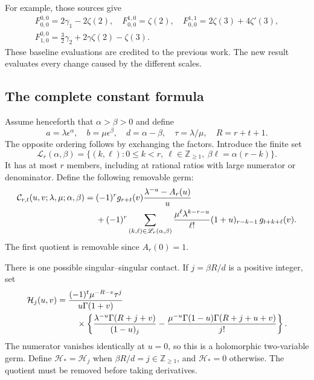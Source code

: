 For example, those sources give
\begin{equation}\label{mc:FP-values}
 \begin{gathered}
 F_{0,0}^{0,0}=2\gamma_1-2\zeta(2),\quad
 F_{0,0}^{1,0}=\zeta(2),\quad
 F_{0,0}^{1,1}=2\zeta(3)+4\zeta'(3),\\
 F_{1,0}^{0,0}=\tfrac32\gamma_2+2\gamma\zeta(2)-\zeta(3).
 \end{gathered}
\end{equation}
These baseline evaluations are credited to the previous work.
The new result evaluates every change caused by the different scales.

\subsection{The complete constant formula}

Assume henceforth that $\alpha>\beta>0$ and define
\begin{equation}\label{mc:scales}
 a=\lambda\epsilon^\alpha,\quad b=\mu\epsilon^\beta,
 \quad d=\alpha-\beta,\quad \tau=\lambda/\mu,
 \quad R=r+t+1.
\end{equation}
The opposite ordering follows by exchanging the factors.
Introduce the finite set
\begin{equation}\label{mc:resonance-set}
 \mathscr L_r(\alpha,\beta)
 =\{(k,\ell):0\le k<r,\ \ell\in\mathbb Z_{\ge1},\
                      \beta\ell=\alpha(r-k)\}.
\end{equation}
It has at most $r$ members, including at rational ratios with
large numerator or denominator. Define the following removable germ:
\begin{align}\label{mc:mixed-contact}
 \mathcal C_{r,t}(u,v;\lambda,\mu;\alpha,\beta)
 ={}&(-1)^r g_{r+t}(v)
                  \frac{\lambda^{-u}-A_r(u)}u\notag\\
 &+(-1)^r\sum_{(k,\ell)\in\mathscr L_r(\alpha,\beta)}
   \frac{\mu^\ell\lambda^{k-r-u}}{\ell!}
                 (1+u)_{r-k-1}\,g_{t+k+\ell}(v).
\end{align}
The first quotient is removable since $A_r(0)=1$.

There is one possible singular--singular contact. If
$j=\beta R/d$ is a positive integer, set
\begin{align}\label{mc:singular-contact}
 \mathcal H_j(u,v)={}&
 \frac{(-1)^t\mu^{-R-v}\tau^j}{u\Gamma(1+v)}\notag\\
 &\quad\times\left\{
 \frac{\lambda^{-u}\Gamma(R+j+v)}{(1-u)_j}
 -\frac{\mu^{-u}\Gamma(1-u)\Gamma(R+j+u+v)}{j!}
                 \right\}.
\end{align}
The numerator vanishes identically at $u=0$, so this is a
holomorphic two-variable germ. Define $\mathcal H_*=\mathcal H_j$
when $\beta R/d=j\in\mathbb Z_{\ge1}$, and $\mathcal H_*=0$
otherwise. The quotient must be removed before taking derivatives.

